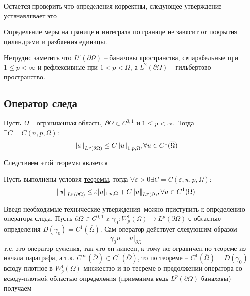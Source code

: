 \documentclass[12pt,a4paper]{article}
\begin{document}
Остается проверить что определения корректны, следующее утверждение устанавливает это
\begin{proposition}{}{}
	Определение меры на границе и интеграла по границе не зависит от покрытия цилиндрами и разбиения единицы.
\end{proposition}
Нетрудно заметить что $L^p (\partial \Omega)$ -- банаховы пространства, сепарабельные при $1 \leq p < \infty$ и рефлексивные при $1 < p < \Omega$, а $L^2 (\partial \Omega)$ -- гильбертово пространство.

\subsection{Оператор следа}

\begin{theorem}{}{}\label{th:4}
	Пусть $\Omega$ -- ограниченная область, $\partial \Omega \in C^{0, 1}$ и $1 \leq p < \infty$.  Тогда \\ $\exists C = C(n, p, \Omega)$:
	\begin{equation*}
		\norm{u}_{L^p (\partial \Omega)} \leq C \norm{u}_{1, p, \Omega}, \forall u \in C^1 (\overline{\Omega})
	\end{equation*}
\end{theorem}
Следствием этой теоремы является
\begin{proposition}{}{}
	Пусть выполнены условия \hyperref[th:4]{теоремы}, тогда $\forall \varepsilon > 0 \exists C = C(\varepsilon, n, p, \Omega)$:
	\begin{equation*}
		\norm{u}_{L^p (\partial \Omega)} \leq \varepsilon |u|_{1, p, \Omega} + C\norm{u}_{L^p (\Omega)}, \forall u \in C^1 (\overline{\Omega})
	\end{equation*}
\end{proposition}

Введя необходимые технические утверждения, можно приступить к определению оператора следа. Пусть $\partial \Omega \in C^{0, 1}$ и $\gamma_0: W_p^1 (\Omega) \to L^p (\partial \Omega)$ с областью определения $D(\gamma_0) = C^1 (\overline{\Omega})$. Сам оператор действует следующим образом
\begin{equation*}
	\gamma_0 u = u|_{\partial \Omega}
\end{equation*}
т.е. это оператор сужения, так что он линеен, к тому же ограничен по теореме из начала параграфа, а т.к. $C^\infty (\overline{\Omega}) \subset C^1 (\overline{\Omega})$, то по \hyperref[th:5]{теореме} -- $C^1 (\overline{\Omega}) = D(\gamma_0)$ всюду плотное в $W_p^1 (\Omega)$ множество и по теореме о продолжении оператора со всюду-плотной областью определения (применима ведь $L^p (\partial \Omega)$ банаховы) получаем
\end{document}
